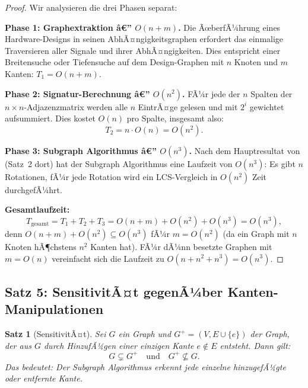 ﻿\documentclass[12pt,a4paper]{report}
\newtheorem{theorem}{Satz}[section]
\begin{document}
\begin{proof}
Wir analysieren die drei Phasen separat:

\textbf{Phase 1: Graphextraktion â€” $O(n + m)$.}
Die ÃœberfÃ¼hrung eines Hardware-Designs in seinen AbhÃ¤ngigkeitsgraphen erfordert das einmalige Traversieren aller Signale und ihrer AbhÃ¤ngigkeiten. Dies entspricht einer Breitensuche oder Tiefensuche auf dem Design-Graphen mit $n$ Knoten und $m$ Kanten: $T_1 = O(n + m)$.

\textbf{Phase 2: Signatur-Berechnung â€” $O(n^2)$.}
FÃ¼r jede der $n$ Spalten der $n \times n$-Adjazenzmatrix werden alle $n$ EintrÃ¤ge gelesen und mit $2^i$ gewichtet aufsummiert. Dies kostet $O(n)$ pro Spalte, insgesamt also:
\[
T_2 = n \cdot O(n) = O(n^2).
\]

\textbf{Phase 3: Subgraph Algorithmus â€” $O(n^3)$.}
Nach dem Hauptresultat von \cite{subgraph2026} (Satz~2 dort) hat der Subgraph Algorithmus eine Laufzeit von $O(n^3)$: Es gibt $n$ Rotationen, fÃ¼r jede Rotation wird ein LCS-Vergleich in $O(n^2)$ Zeit durchgefÃ¼hrt.

\textbf{Gesamtlaufzeit:}
\[
T_{\mathrm{gesamt}} = T_1 + T_2 + T_3 = O(n + m) + O(n^2) + O(n^3) = O(n^3),
\]
denn $O(n + m) + O(n^2) \subseteq O(n^3)$ fÃ¼r $m = O(n^2)$ (da ein Graph mit $n$ Knoten hÃ¶chstens $n^2$ Kanten hat). FÃ¼r dÃ¼nn besetzte Graphen mit $m = O(n)$ vereinfacht sich die Laufzeit zu $O(n + n^2 + n^3) = O(n^3)$.
\end{proof}

\subsection{Satz 5: SensitivitÃ¤t gegenÃ¼ber Kanten-Manipulationen}

\begin{theorem}[SensitivitÃ¤t]
\label{thm:sensitivitaet}
Sei $G$ ein Graph und $G^+ = (V, E \cup \{e\})$ der Graph, der aus $G$ durch HinzufÃ¼gen einer einzigen Kante $e \notin E$ entsteht. Dann gilt:
\[
G \subsetneq G^+ \quad \text{und} \quad G^+ \not\subseteq G.
\]
Das bedeutet: Der Subgraph Algorithmus erkennt jede einzelne hinzugefÃ¼gte oder entfernte Kante.
\end{theorem}
\end{document}
